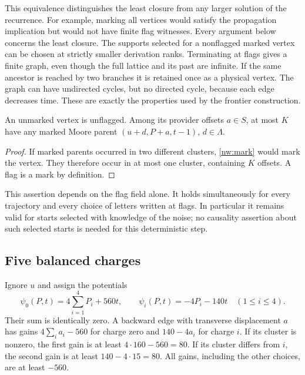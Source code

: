 This equivalence distinguishes the least closure from any larger solution of the recurrence. For example, marking all vertices would satisfy the propagation implication but would not have finite flag witnesses. Every argument below concerns the least closure. The supports selected for a nonflagged marked vertex can be chosen at strictly smaller derivation ranks. Terminating at flags gives a finite graph, even though the full lattice and its past are infinite. If the same ancestor is reached by two branches it is retained once as a physical vertex. The graph can have undirected cycles, but no directed cycle, because each edge decreases time. These are exactly the properties used by the frontier construction.
\begin{lemma}\label{nw:budget}
An unmarked vertex is unflagged. Among its provider offsets $a\in S$, at most $K$ have any marked Moore parent $(u+d,P+a,t-1)$, $d\in\Lambda$.
\end{lemma}
\begin{proof}
If marked parents occurred in two different clusters, \eqref{nw:mark} would mark the vertex. They therefore occur in at most one cluster, containing $K$ offsets. A flag is a mark by definition.
\end{proof}

This assertion depends on the flag field alone. It holds simultaneously for every trajectory and every choice of letters written at flags. In particular it remains valid for starts selected with knowledge of the noise; no causality assertion about such selected starts is needed for this deterministic step.

\subsection{Five balanced charges}

Ignore $u$ and assign the potentials
\begin{equation}\label{nw:potentials}
  \psi_0(P,t)=4\sum_{i=1}^{4}P_i+560t,\qquad
  \psi_i(P,t)=-4P_i-140t\quad(1\le i\le 4).
\end{equation}
Their sum is identically zero. A backward edge with transverse displacement $a$ has gains
$4\sum_i a_i-560$ for charge zero and $140-4a_i$ for charge $i$. If its cluster is nonzero, the
first gain is at least $4\cdot160-560=80$. If its cluster differs from $i$, the second gain is at
least $140-4\cdot15=80$. All gains, including the other choices, are at least $-560$.

